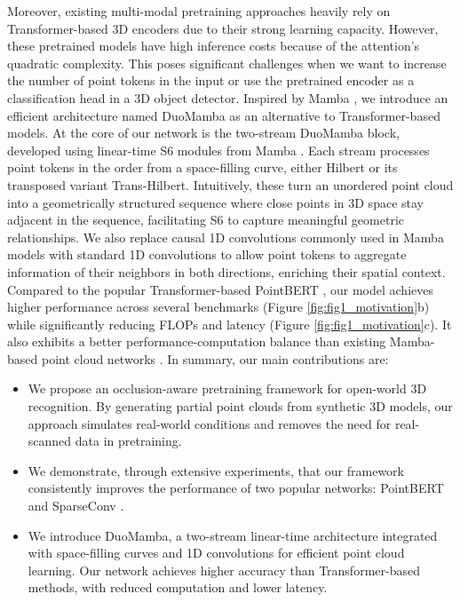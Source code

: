 \vspace{-1mm}
Moreover, existing multi-modal pretraining approaches \cite{mixcon3d,uni3d,openshape,ulip,ulip2} heavily rely on Transformer-based 3D encoders due to their strong learning capacity. However, these pretrained models have high inference costs because of the attention's quadratic complexity. This poses significant challenges when we want to increase the number of point tokens in the input or use the pretrained encoder as a classification head in a 3D object detector. Inspired by Mamba \cite{mamba}, we introduce an efficient architecture named DuoMamba as an alternative to Transformer-based models. At the core of our network is the two-stream DuoMamba block, developed using linear-time S6 modules from Mamba \cite{mamba}. Each stream processes point tokens in the order from a space-filling curve, either Hilbert \cite{hilbert_curve} or its transposed variant Trans-Hilbert. Intuitively, these turn an unordered point cloud into a geometrically structured sequence where close points in 3D space stay adjacent in the sequence, facilitating S6 to capture meaningful geometric relationships. We also replace causal 1D convolutions commonly used in Mamba models \cite{mamba,vmamba,mamba3d,pointmamba} with standard 1D convolutions to allow point tokens to aggregate information of their neighbors in both directions, enriching their spatial context. 
Compared to the popular Transformer-based PointBERT \cite{pointbert}, our model achieves higher performance across several benchmarks (Figure \ref{fig:fig1_motivation}b) while significantly reducing FLOPs and latency (Figure \ref{fig:fig1_motivation}c). It also exhibits a better performance-computation balance than existing Mamba-based point cloud networks \cite{mamba3d,pointmamba}. In summary, our main contributions are:
\begin{itemize}
\item We propose an occlusion-aware pretraining framework for open-world 3D recognition. By generating partial point clouds from synthetic 3D models, our approach simulates real-world conditions and removes the need for real-scanned data in pretraining.
\item We demonstrate, through extensive experiments, that our framework consistently improves the performance of two popular networks: PointBERT \cite{pointbert} and SparseConv \cite{sparseconv}.
\item We introduce DuoMamba, a two-stream linear-time architecture integrated with space-filling curves and 1D convolutions for efficient point cloud learning. Our network achieves higher accuracy than Transformer-based methods, with reduced computation and lower latency.

\end{itemize}
